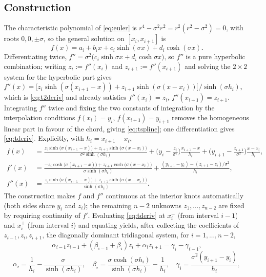 \documentclass[]{interact}
\theoremstyle{plain}
\begin{document}
\subsection{Construction}
The characteristic polynomial of \eqref{eq:euler} is $r^4-\sigma^2 r^2=r^2(r^2-\sigma^2)=0$,
with roots $0,0,\pm\sigma$, so the general solution on $[x_i,x_{i+1}]$ is
\[
f(x)=a_i+b_i x+c_i\sinh(\sigma x)+d_i\cosh(\sigma x).
\]
Differentiating twice, $f''=\sigma^2\big(c_i\sinh\sigma x+d_i\cosh\sigma x\big)$, so $f''$ is a
pure hyperbolic combination; writing $z_i:=f''(x_i)$ and $z_{i+1}:=f''(x_{i+1})$ and solving the
$2\times2$ system for the hyperbolic part gives
$f''(x)=\big[z_i\sinh(\sigma(x_{i+1}-x))+z_{i+1}\sinh(\sigma(x-x_i))\big]/\sinh(\sigma h_i)$,
which is \eqref{eq:t2deriv} and already satisfies $f''(x_i)=z_i$, $f''(x_{i+1})=z_{i+1}$.
Integrating $f''$ twice and fixing the two constants of integration by the interpolation
conditions $f(x_i)=y_i$, $f(x_{i+1})=y_{i+1}$ removes the homogeneous linear part in favour of
the chord, giving \eqref{eq:tspline}; one differentiation gives \eqref{eq:tderiv}. Explicitly,
with $h_i=x_{i+1}-x_i$,
\begin{align}
f(x)&=\frac{z_i\sinh\!\big(\sigma(x_{i+1}-x)\big)+z_{i+1}\sinh\!\big(\sigma(x-x_i)\big)}
{\sigma^2\sinh(\sigma h_i)}
+\Big(y_i-\tfrac{z_i}{\sigma^2}\Big)\frac{x_{i+1}-x}{h_i}
+\Big(y_{i+1}-\tfrac{z_{i+1}}{\sigma^2}\Big)\frac{x-x_i}{h_i},\label{eq:tspline}\\[2pt]
f'(x)&=\frac{-z_i\cosh\!\big(\sigma(x_{i+1}-x)\big)+z_{i+1}\cosh\!\big(\sigma(x-x_i)\big)}
{\sigma\sinh(\sigma h_i)}
+\frac{(y_{i+1}-y_i)-(z_{i+1}-z_i)/\sigma^2}{h_i},\label{eq:tderiv}\\[2pt]
f''(x)&=\frac{z_i\sinh\!\big(\sigma(x_{i+1}-x)\big)+z_{i+1}\sinh\!\big(\sigma(x-x_i)\big)}
{\sinh(\sigma h_i)}.\label{eq:t2deriv}
\end{align}
The construction makes $f$ and $f''$ continuous at the interior knots automatically (both sides
share $y_i$ and $z_i$); the remaining $n-2$ unknowns $z_1,\dots,z_{n-2}$ are fixed by requiring
continuity of $f'$. Evaluating \eqref{eq:tderiv} at $x_i^{-}$ (from interval $i-1$) and $x_i^{+}$
(from interval $i$) and equating yields, after collecting the coefficients of $z_{i-1},z_i,z_{i+1}$,
the diagonally dominant tridiagonal system, for $i=1,\dots,n-2$,
\begin{equation}
\alpha_{i-1}z_{i-1}+(\beta_{i-1}+\beta_i)z_i+\alpha_i z_{i+1}=\gamma_i-\gamma_{i-1},
\label{eq:ttridiag}
\end{equation}
\begin{equation}
\alpha_i=\frac{1}{h_i}-\frac{\sigma}{\sinh(\sigma h_i)},\quad
\beta_i=\frac{\sigma\cosh(\sigma h_i)}{\sinh(\sigma h_i)}-\frac{1}{h_i},\quad
\gamma_i=\frac{\sigma^2(y_{i+1}-y_i)}{h_i},
\end{equation}
\end{document}
